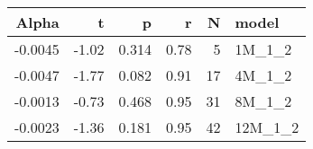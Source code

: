 \begin{table}[ht]
\centering
\begin{tabular}{rrrrrl}
  \hline
Alpha & t & p & r & N & model \\ 
  \hline
-0.0045 & -1.02 & 0.314 & 0.78 & 5 & 1M\_1\_2 \\ 
  -0.0047 & -1.77 & 0.082 & 0.91 & 17 & 4M\_1\_2 \\ 
  -0.0013 & -0.73 & 0.468 & 0.95 & 31 & 8M\_1\_2 \\ 
  -0.0023 & -1.36 & 0.181 & 0.95 & 42 & 12M\_1\_2 \\ 
   \hline
\end{tabular}
\end{table}

